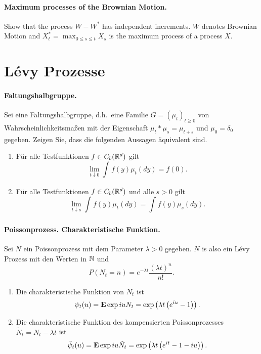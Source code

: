\paragraph{Maximum processes of the Brownian Motion. } Show that the process $W
- W^*$ has independent increments. $W$ denotes Brownian Motion and $X^*_t=
\max_{0 \leq s \leq t} X_s$ is the maximum process of a \cadlag process $X$.



\section{L\'evy Prozesse}

\paragraph{Faltungshalbgruppe.}
Sei eine Faltungshalbgruppe, d.h.\ eine Familie $G=(\mu_t)_{t\geq 0}$ von
Wahrscheinlichkeitsmaßen mit der Eigenschaft $\mu_t * \mu_s = \mu_{t+s}$ und
$\mu_0 = \delta_0$ gegeben. Zeigen Sie, dass die folgenden Aussagen äquivalent
sind.
\begin{enumerate}
    \item Für alle Testfunktionen $f\in C_b(\mathbb R^d)$ gilt
        \begin{equation*}
            \lim_{t\downarrow 0} \int_{}^{} f(y) \mu_t(dy) = f(0).
        \end{equation*}
    \item Für alle Testfunktionen $f\in C_b(\mathbb R^d)$ und alle $s>0$ gilt
        \begin{equation*}
            \lim_{t\downarrow s} \int_{}^{} f(y) \mu_t(dy) =
            \int_{}^{} f(y) \mu_s(dy). 
        \end{equation*}
\end{enumerate}

\paragraph{Poissonprozess. Charakteristische Funktion. } Sei $N$ ein
Poissonprozess mit dem Parameter $\lambda>0$ gegeben. $N$ is also ein L\'evy
Prozess mit den Werten in $\mathbb N$ und 
\begin{equation*}
    P(N_t = n) = e^{- \lambda t} \frac{ (\lambda t)^n}{ n!}.
\end{equation*}
\begin{enumerate}
    \item Die charakteristische Funktion von $N_t$ ist 
        \begin{equation*}
            \psi_t(u) = \mathbf{E} \exp iu N_t = \exp \left( \lambda t \left( e^{iu} -1\right) \right).
        \end{equation*}
    \item Die charakteristische Funktion des kompensierten Poissonprozesses
        $\tilde N_t = N_t - \lambda t$ ist 
        \begin{equation*}
            \tilde \psi_t (u) = \mathbf{E} \exp iu \tilde N_t = 
            \exp \left( \lambda t \left( e^{it}-1-iu \right) \right). 
        \end{equation*}
\end{enumerate} 

